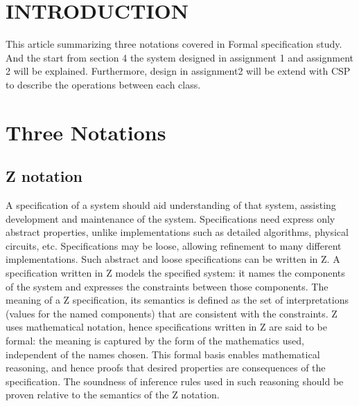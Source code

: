 \section{INTRODUCTION}
This article summarizing three notations covered in Formal specification study. And the start from section 4 the system designed in assignment 1 and assignment 2 will be explained. Furthermore, design in assignment2 will be extend with CSP to describe the operations between each class. 


\section{Three Notations}
\subsection{Z notation}
A specification of a system should aid understanding of that system, assisting development and maintenance of the system. Specifications need express only abstract properties, unlike implementations such as detailed algorithms, physical circuits, etc. Specifications may be loose, allowing refinement to many different implementations. Such abstract and loose specifications can be written in Z.
A specification written in Z models the specified system: it names the components of the system and expresses the constraints between those components. The meaning of a Z specification, its semantics is defined as the set of interpretations (values for the named components) that are consistent with the constraints.
Z uses mathematical notation, hence specifications written in Z are said to be formal: the meaning is captured by the form of the mathematics used, independent of the names chosen. This formal basis enables mathematical reasoning, and hence proofs that desired properties are consequences of the specification. The soundness of inference rules used in such reasoning should be proven relative to the semantics of the Z notation.\cite{Z}
